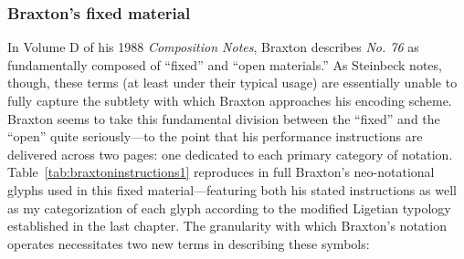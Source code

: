         
    \subsubsection{Braxton's fixed material}

        In Volume D of his 1988 \textit{Composition Notes}, Braxton describes \textit{No. 76} as fundamentally composed of ``fixed'' and ``open materials.'' As Steinbeck notes, though, these terms (at least under their typical usage) are essentially unable to fully capture the subtlety with which Braxton approaches his encoding scheme.\autocite[254]{Steinbeck_2018} Braxton seems to take this fundamental division between the ``fixed'' and the ``open'' quite seriously---to the point that his performance instructions are delivered across two pages: one dedicated to each primary category of notation. Table~\ref{tab:braxtoninstructions1} reproduces in full Braxton's neo-notational glyphs used in this fixed material---featuring both his stated instructions as well as my categorization of each glyph according to the modified Ligetian typology established in the last chapter. The granularity with which Braxton's notation operates necessitates two new terms in describing these symbols: 
        

